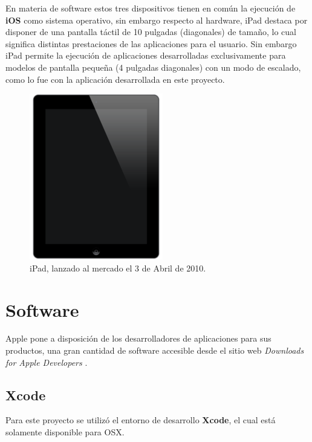 En materia de software estos tres dispositivos tienen en común la ejecución de \textbf{iOS} como sistema operativo, sin embargo respecto al hardware, iPad destaca por disponer de una pantalla táctil de 10 pulgadas (diagonales) de tamaño, lo cual significa distintas prestaciones de las aplicaciones para el usuario. Sin embargo iPad permite la ejecución de aplicaciones desarrolladas exclusivamente para modelos de pantalla pequeña (4 pulgadas diagonales) con un modo de escalado, como lo fue con la aplicación desarrollada en este proyecto.

\begin{figure}[H]
	\centering
	\includegraphics[scale=0.4]{imgs/ipad-hw.png} 
	\caption{iPad, lanzado al mercado el 3 de Abril de 2010.}
	\label{img:ipad-hw}
\end{figure} 	 
		 
	\section{Software}
Apple pone a disposición de los desarrolladores de aplicaciones para sus productos, una gran cantidad de software accesible desde el sitio web \textit{Downloads for Apple Developers} \cite{apple-repositorio}.
		\subsection{Xcode}
		\label{anexo:xcode}
		Para este proyecto se utilizó el entorno de desarrollo \textbf{Xcode}, el cual está solamente disponible para OSX.\\


